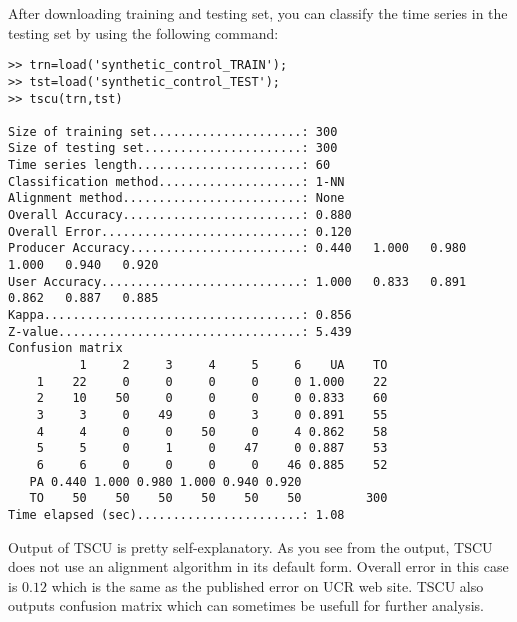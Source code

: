 \documentclass{article}
\begin{document}
After downloading training and testing set, you can classify the time series in the testing set by using the following command:
\begin{scriptsize}
\begin{verbatim}
>> trn=load('synthetic_control_TRAIN');
>> tst=load('synthetic_control_TEST');
>> tscu(trn,tst)

Size of training set.....................: 300
Size of testing set......................: 300
Time series length.......................: 60
Classification method....................: 1-NN
Alignment method.........................: None
Overall Accuracy.........................: 0.880   
Overall Error............................: 0.120   
Producer Accuracy........................: 0.440   1.000   0.980   1.000   0.940   0.920   
User Accuracy............................: 1.000   0.833   0.891   0.862   0.887   0.885   
Kappa....................................: 0.856   
Z-value..................................: 5.439   
Confusion matrix
          1     2     3     4     5     6    UA    TO 
    1    22     0     0     0     0     0 1.000    22 
    2    10    50     0     0     0     0 0.833    60 
    3     3     0    49     0     3     0 0.891    55 
    4     4     0     0    50     0     4 0.862    58 
    5     5     0     1     0    47     0 0.887    53 
    6     6     0     0     0     0    46 0.885    52 
   PA 0.440 1.000 0.980 1.000 0.940 0.920 
   TO    50    50    50    50    50    50         300 
Time elapsed (sec).......................: 1.08 
\end{verbatim}
\end{scriptsize}
Output of TSCU is pretty self-explanatory.  As you see from the output, TSCU does not use an alignment algorithm in its default form. Overall error in this case is $0.12$ which is the same as the published error on UCR web site. TSCU also outputs confusion matrix which can sometimes be usefull for further analysis.
\end{document}
